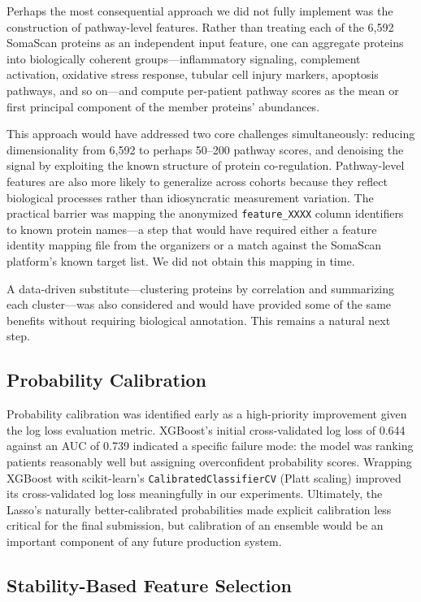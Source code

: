 \documentclass[11pt]{article}
\begin{document}
Perhaps the most consequential approach we did not fully implement was the construction of pathway-level features. Rather than treating each of the 6,592 SomaScan proteins as an independent input feature, one can aggregate proteins into biologically coherent groups---inflammatory signaling, complement activation, oxidative stress response, tubular cell injury markers, apoptosis pathways, and so on---and compute per-patient pathway scores as the mean or first principal component of the member proteins' abundances.


This approach would have addressed two core challenges simultaneously: reducing dimensionality from 6,592 to perhaps 50--200 pathway scores, and denoising the signal by exploiting the known structure of protein co-regulation. Pathway-level features are also more likely to generalize across cohorts because they reflect biological processes rather than idiosyncratic measurement variation. The practical barrier was mapping the anonymized \texttt{feature\_XXXX} column identifiers to known protein names---a step that would have required either a feature identity mapping file from the organizers or a match against the SomaScan platform's known target list. We did not obtain this mapping in time.


A data-driven substitute---clustering proteins by correlation and summarizing each cluster---was also considered and would have provided some of the same benefits without requiring biological annotation. This remains a natural next step.


\subsection*{Probability Calibration}

Probability calibration was identified early as a high-priority improvement given the log loss evaluation metric. XGBoost's initial cross-validated log loss of 0.644 against an AUC of 0.739 indicated a specific failure mode: the model was ranking patients reasonably well but assigning overconfident probability scores. Wrapping XGBoost with scikit-learn's \texttt{CalibratedClassifierCV} (Platt scaling) improved its cross-validated log loss meaningfully in our experiments. Ultimately, the Lasso's naturally better-calibrated probabilities made explicit calibration less critical for the final submission, but calibration of an ensemble would be an important component of any future production system.


\subsection*{Stability-Based Feature Selection}
\end{document}
